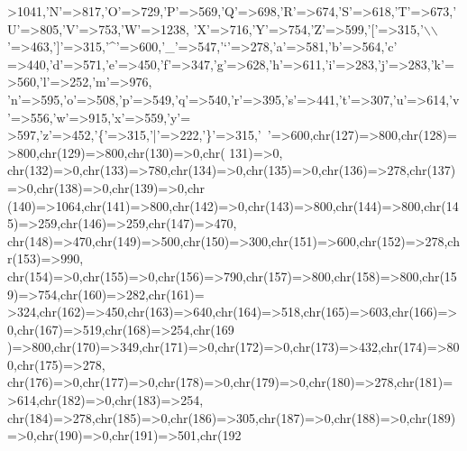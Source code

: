 \begin{DoxyCode}
{      >1041,\textcolor{charliteral}{'N'}=>817,\textcolor{charliteral}{'O'}=>729,\textcolor{charliteral}{'P'}=>569,\textcolor{charliteral}{'Q'}=>698,\textcolor{charliteral}{'R'}=>674,\textcolor{charliteral}{'S'}=>618,\textcolor{charliteral}{'T'}=>673,\textcolor{charliteral}{'U'}=>805,\textcolor{charliteral}{'V'}=>753,\textcolor{charliteral}{'W'}=>1238,
    \textcolor{charliteral}{'X'}=>716,\textcolor{charliteral}{'Y'}=>754,\textcolor{charliteral}{'Z'}=>599,\textcolor{charliteral}{'['}=>315,\textcolor{charliteral}{'\(\backslash\)\(\backslash\)'}=>463,\textcolor{charliteral}{']'}=>315,\textcolor{charliteral}{'^'}=>600,\textcolor{charliteral}{'\_'}=>547,\textcolor{charliteral}{'`'}=>278,\textcolor{charliteral}{'a'}=>581,\textcolor{charliteral}{'b'}=>564,\textcolor{charliteral}{'c'}
      =>440,\textcolor{charliteral}{'d'}=>571,\textcolor{charliteral}{'e'}=>450,\textcolor{charliteral}{'f'}=>347,\textcolor{charliteral}{'g'}=>628,\textcolor{charliteral}{'h'}=>611,\textcolor{charliteral}{'i'}=>283,\textcolor{charliteral}{'j'}=>283,\textcolor{charliteral}{'k'}=>560,\textcolor{charliteral}{'l'}=>252,\textcolor{charliteral}{'m'}=>976,
    \textcolor{charliteral}{'n'}=>595,\textcolor{charliteral}{'o'}=>508,\textcolor{charliteral}{'p'}=>549,\textcolor{charliteral}{'q'}=>540,\textcolor{charliteral}{'r'}=>395,\textcolor{charliteral}{'s'}=>441,\textcolor{charliteral}{'t'}=>307,\textcolor{charliteral}{'u'}=>614,\textcolor{charliteral}{'v'}=>556,\textcolor{charliteral}{'w'}=>915,\textcolor{charliteral}{'x'}=>559,\textcolor{charliteral}{'y'}=
      >597,\textcolor{charliteral}{'z'}=>452,\textcolor{charliteral}{'\{'}=>315,\textcolor{charliteral}{'|'}=>222,\textcolor{charliteral}{'\}'}=>315,\textcolor{charliteral}{'~'}=>600,chr(127)=>800,chr(128)=>800,chr(129)=>800,chr(130)=>0,chr(
      131)=>0,
    chr(132)=>0,chr(133)=>780,chr(134)=>0,chr(135)=>0,chr(136)=>278,chr(137)=>0,chr(138)=>0,chr(139)=>0,chr
      (140)=>1064,chr(141)=>800,chr(142)=>0,chr(143)=>800,chr(144)=>800,chr(145)=>259,chr(146)=>259,chr(147)=>470,
      chr(148)=>470,chr(149)=>500,chr(150)=>300,chr(151)=>600,chr(152)=>278,chr(153)=>990,
    chr(154)=>0,chr(155)=>0,chr(156)=>790,chr(157)=>800,chr(158)=>800,chr(159)=>754,chr(160)=>282,chr(161)=
      >324,chr(162)=>450,chr(163)=>640,chr(164)=>518,chr(165)=>603,chr(166)=>0,chr(167)=>519,chr(168)=>254,chr(169
      )=>800,chr(170)=>349,chr(171)=>0,chr(172)=>0,chr(173)=>432,chr(174)=>800,chr(175)=>278,
    chr(176)=>0,chr(177)=>0,chr(178)=>0,chr(179)=>0,chr(180)=>278,chr(181)=>614,chr(182)=>0,chr(183)=>254,
      chr(184)=>278,chr(185)=>0,chr(186)=>305,chr(187)=>0,chr(188)=>0,chr(189)=>0,chr(190)=>0,chr(191)=>501,chr(192
}
\end{DoxyCode}
